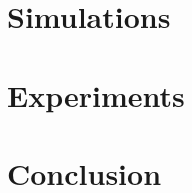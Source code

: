 \documentclass{article}
\begin{document}
\section{Simulations}

\section{Experiments}

\section{Conclusion}
\end{document}
